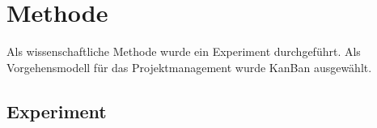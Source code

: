 \chapter{Methode}\label{ch:Methode}


Als wissenschaftliche Methode wurde ein Experiment durchgeführt.
Als Vorgehensmodell für das Projektmanagement wurde KanBan ausgewählt.



\section{Experiment}\label{sec:experiment}


